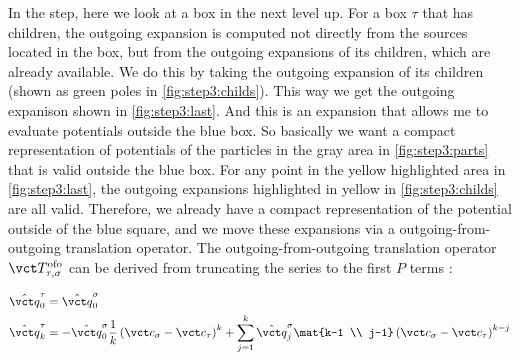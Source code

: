 \begin{enumerate}
    In the  step, here we look at a box in the next level up.
    For a box $\tau$ that has children, the outgoing expansion is computed not directly from the sources located in the box, but from the outgoing expansions of its children, which are already available.
    We do this by taking the outgoing expansion of its children (shown as green poles in \cref{fig:step3:childs}).
    This way we get the outgoing expanison shown in \cref{fig:step3:last}.
    And this is an expansion that allows me to evaluate potentials outside the blue box.
    So basically we want a compact representation of potentials of the particles in the gray area in \cref{fig:step3:parts} that is valid outside the blue box.
    For any point in the yellow highlighted area in \cref{fig:step3:last}, the outgoing expansions highlighted in yellow in \cref{fig:step3:childs} are all valid.
    Therefore, we already have a compact representation of the potential outside of the blue square, and we move these expansions via a outgoing-from-outgoing translation operator.
    The outgoing-from-outgoing translation operator $\vct T_{\tau, \sigma}^\mathrm{ofo}$ can be derived from truncating the series to the first $P$ terms \cite{Martinsson2015}:

    \begin{equation}
      \begin{split}
        \hat{\vct q}_{0}^{\tau} &= \hat{\vct q}_{0}^{\sigma} \\
        \hat{\vct q}_{k}^{\tau}
          &= - \hat{\vct q}_{0}^{\sigma} \frac{1}{k} \left(\vct c_{\sigma}-\vct c_{\tau}\right)^{k}
             + \sum_{j=1}^{k} \hat{\vct q}_{j}^{\sigma} \mat{k-1 \\ j-1} \left(\vct c_{\sigma}-\vct c_{\tau}\right)^{k-j}
      \end{split}
    \end{equation}

  \begin{figure}
    \centering
\end{figure}
\end{enumerate}
